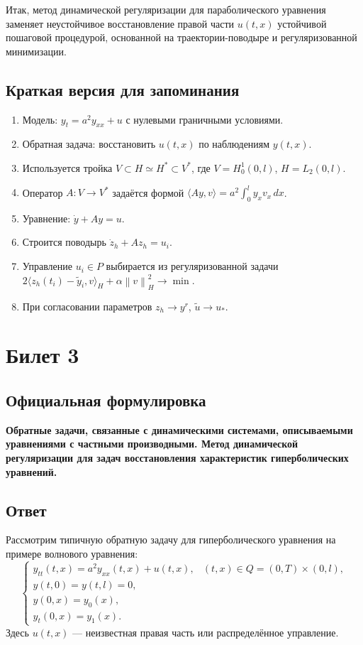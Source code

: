 \documentclass[12pt,a4paper]{article}
\newcommand{\dd}{\,d}
\newcommand{\norm}[1]{\left\lVert #1\right\rVert}
\begin{document}
Итак, метод динамической регуляризации для параболического уравнения заменяет неустойчивое восстановление правой части $u(t,x)$ устойчивой пошаговой процедурой, основанной на траектории-поводыре и регуляризованной минимизации.

\subsection*{Краткая версия для запоминания}

\begin{enumerate}
    \item Модель: $y_t=a^2y_{xx}+u$ с нулевыми граничными условиями.
    \item Обратная задача: восстановить $u(t,x)$ по наблюдениям $y(t,x)$.
    \item Используется тройка $V\subset H\simeq H^*\subset V^*$, где $V=H_0^1(0,l)$, $H=L_2(0,l)$.
    \item Оператор $A:V\to V^*$ задаётся формой $\langle Ay,v\rangle=a^2\int_0^l y_xv_x\dd x$.
    \item Уравнение: $\dot y+Ay=u$.
    \item Строится поводырь $\dot z_h+Az_h=u_i$.
    \item Управление $u_i\in P$ выбирается из регуляризованной задачи $2\langle z_h(t_i)-\tilde y_i,v\rangle_H+\alpha\norm{v}_H^2\to\min$.
    \item При согласовании параметров $z_h\to y^r$, $\tilde u\to u_*$.
\end{enumerate}

\section{Билет 3}

\subsection*{Официальная формулировка}

\textbf{Обратные задачи, связанные с динамическими системами, описываемыми уравнениями с частными производными. Метод динамической регуляризации для задач восстановления характеристик гиперболических уравнений.}

\subsection*{Ответ}

Рассмотрим типичную обратную задачу для гиперболического уравнения на примере волнового уравнения:
\begin{equation}
\begin{cases}
    y_{tt}(t,x)=a^2y_{xx}(t,x)+u(t,x), &(t,x)\in Q=(0,T)\times(0,l),\\
    y(t,0)=y(t,l)=0,\\
    y(0,x)=y_0(x),\\
    y_t(0,x)=y_1(x).
\end{cases}
\end{equation}
Здесь $u(t,x)$ --- неизвестная правая часть или распределённое управление.
\end{document}
